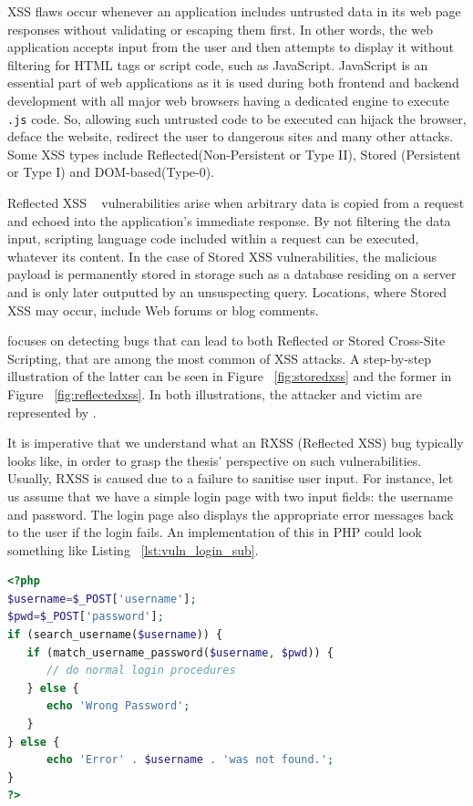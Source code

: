 XSS flaws occur whenever an application includes untrusted data in its web page responses without validating or escaping them first. In other words, the web application accepts input from the user and then attempts to display it without filtering for HTML tags or script code, such as JavaScript. JavaScript is an essential part of web applications as it is used during both frontend and backend development with all major web browsers having a dedicated engine to execute {\tt .js} code. So, allowing such untrusted code to be executed can hijack the browser, deface the website, redirect the user to dangerous sites and many other attacks. Some XSS types include Reflected(Non-Persistent or Type II), Stored (Persistent or Type I) and DOM-based(Type-0).

Reflected XSS ~\cite{rxss_def} vulnerabilities arise when arbitrary data is copied from a request and echoed into the application's immediate response. By not filtering the data input, scripting language code included within a request can be executed, whatever its content. In the case of Stored XSS vulnerabilities, the malicious payload is permanently stored in storage such as a database residing on a server and is only later outputted by an unsuspecting query. Locations, where Stored XSS may occur, include Web forums or blog comments. 

\pname{} focuses on detecting bugs that can lead to both Reflected or Stored Cross-Site Scripting, that are among the most common of XSS attacks. A step-by-step illustration of the latter can be seen in Figure ~\ref{fig:storedxss} and the former in Figure ~\ref{fig:reflectedxss}. In both illustrations, the attacker and victim are represented by \pname{}.

It is imperative that we understand what an RXSS (Reflected XSS) bug typically looks like, in order to grasp the thesis' perspective on such vulnerabilities. Usually, RXSS is caused due to a failure to sanitise user input. For instance, let us assume that we have a simple login page with two input fields: the username and password. The login page also displays the appropriate error messages back to the user if the login fails. An implementation of this in PHP could look something like Listing ~\ref{lst:vuln_login_sub}.

\begin{lstlisting}[aboveskip=\baselineskip, showstringspaces=false, frame=single, language=PHP, caption={\textit{Vulnerable login form}}, numberstyle=\color{gray}, numbersep=5pt, label={lst:vuln_login_sub}]
<?php
$username=$_POST['username'];
$pwd=$_POST['password'];
if (search_username($username)) {
   if (match_username_password($username, $pwd)) {
      // do normal login procedures
   } else {
      echo 'Wrong Password';
   }
} else {
      echo 'Error' . $username . 'was not found.';
}
?>
\end{lstlisting}

